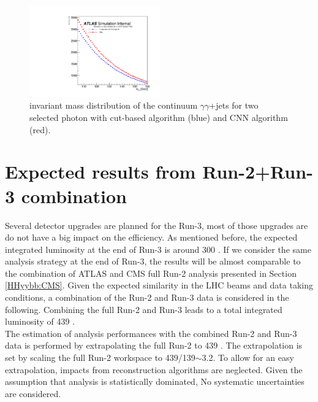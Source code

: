 \begin{figure}[htbp]
    \centering
    \includegraphics[width=0.5\textwidth]{Ch6/Img/Eff_Tight_All_Inclusive_Tight_M.pdf}
     \begin{tcolorbox}[colback=black!5!white, colframe=white!75!black]
    \caption{\myy invariant mass distribution of the continuum $\gamma\gamma$+jets for two selected photon with cut-based algorithm (blue) and CNN algorithm (red).}
    \label{fig:HL-LHC:Run-3:CNN:Cont:M}
    \end{tcolorbox}
\end{figure}

\section{Expected results from Run-2+Run-3 combination}
\label{Run-3}

Several detector upgrades are planned for the Run-3, most of those upgrades are do not have a big impact on the \HHyybb efficiency.  As mentioned before, the expected integrated luminosity at the end of Run-3 is around 300 \ifb. If we consider the same \HHyybb analysis strategy at the end of Run-3, the \HHyybb results will be almost comparable to the combination of ATLAS and CMS full Run-2 analysis presented in Section \ref{HHyybb:CMS}. Given the expected similarity in the LHC beams and data taking conditions, a combination of the Run-2 and Run-3 data is considered in the following. Combining the full Run-2 and Run-3 leads to a total integrated luminosity of 439 \ifb. \\

The estimation of \HHyybb analysis performances with the combined Run-2 and Run-3 data is performed by extrapolating the full Run-2 \HHyybb to 439 \ifb. The extrapolation is set by scaling the full Run-2 workspace to 439/139$\sim$3.2. To allow for an easy extrapolation, impacts from reconstruction algorithms are neglected. Given the assumption that \HHyybb analysis is statistically dominated, No systematic uncertainties are considered. \\

